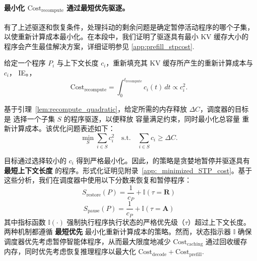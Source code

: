 \paragraph{最小化 $\text{Cost}_{\text{recompute}}$ 通过最短优先驱逐。}
有了上述驱逐和恢复条件，处理抖动的剩余问题是确定暂停活动程序的哪个子集，以使重新计算成本最小化。在本段中，我们证明了驱逐具有最小 KV 缓存大小的程序会产生最佳解决方案，详细证明参见 \autoref{app:prefill_stpcost}.

\begin{lemma}
\label{lem:recompute_quadratic}
给定一个程序 $P_i$ 与上下文长度 $c_i$，重新填充其 KV 缓存所产生的重新计算成本与 $c_i$， IE。，
\begin{equation}
    \text{Cost}_{\text{recompute}} = \int_{0}^{t_{\mathrm{recompute}}} c_i(t) \, dt \propto c_i^2.
\end{equation}
\end{lemma}

\begin{definition}
\label{def:eviction_problem}
基于引理~\ref{lem:recompute_quadratic}，给定所需的内存释放 $\Delta C$，调度器的目标是
选择一个子集 $S$ 的程序驱逐，以便释放
容量满足约束，同时最小化总容量
重新计算成本。该优化问题表述如下：
\begin{equation}
\min_{S} \sum_{i \in S} c_i^2
\quad \text{s.t.} \quad
\sum_{i \in S} c_i \ge \Delta C.
\end{equation}
\end{definition}

目标通过选择较小的 $c_i$ 得到严格最小化。因此，\ouralg 的策略是贪婪地暂停并驱逐具有 \textbf{最短上下文长度} 的程序。形式化证明见附录~\ref{app:_minimized_STP_cost}。基于这些分析，我们在调度器中使用以下分数来恢复和暂停程序：
\begin{equation}
    S_{\mathrm{restore}}(P) = \frac{1}{c_P} + \mathbb{I}(\tau = \textbf{R})
\end{equation}
\begin{equation}
    S_{\mathrm{pause}}(P) = \frac{1}{c_P} + \mathbb{I}(\tau = \textbf{A})
    \end{equation}
\noindent 其中指标函数 $\mathbb{I}(\cdot)$ 强制执行程序执行状态的严格优先级（$\tau$）超过上下文长度。两种机制都遵循 \textbf{最短优先} 最小化重新计算成本的策略。然而，状态指示器 $\mathbb{I}$ 确保调度器优先考虑暂停智能体程序，从而最大限度地减少 $\text{Cost}_{\text{caching}}$ 通过回收缓存内存，同时优先考虑恢复推理程序以最大化 $\text{Cost}_{\text{decode}} + \text{Cost}_{\text{prefill}}$.

